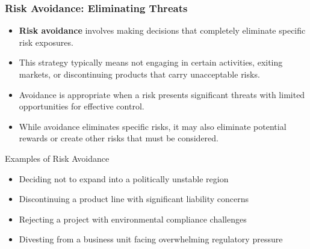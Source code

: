 \documentclass{beamer}
\begin{document}
          \begin{frame}
            \frametitle{Risk Avoidance: Eliminating Threats}
            \begin{itemize}
              \item \textbf{Risk avoidance} involves making decisions that completely eliminate specific risk exposures.
              \item This strategy typically means not engaging in certain activities, exiting markets, or discontinuing products that carry unacceptable risks.
              \item Avoidance is appropriate when a risk presents significant threats with limited opportunities for effective control.
              \item While avoidance eliminates specific risks, it may also eliminate potential rewards or create other risks that must be considered.
            \end{itemize}
            
            \begin{block}{Examples of Risk Avoidance}
            \begin{itemize}
              \item Deciding not to expand into a politically unstable region
              \item Discontinuing a product line with significant liability concerns
              \item Rejecting a project with environmental compliance challenges
              \item Divesting from a business unit facing overwhelming regulatory pressure
            \end{itemize}
            \end{block}
            \end{frame}
            
\end{document}
